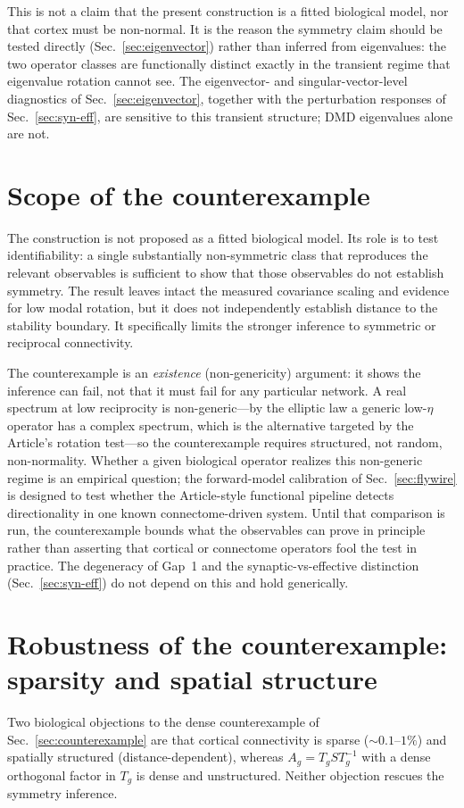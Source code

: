 \documentclass[11pt]{article}
\begin{document}
This is not a claim that the present construction is a fitted biological model,
nor that cortex must be non-normal. It is the reason the symmetry claim should
be tested directly (Sec.~\ref{sec:eigenvector}) rather than inferred from
eigenvalues: the two operator classes are functionally distinct exactly in the
transient regime that eigenvalue rotation cannot see. The eigenvector- and
singular-vector-level diagnostics of Sec.~\ref{sec:eigenvector}, together with
the perturbation responses of Sec.~\ref{sec:syn-eff}, are sensitive to this
transient structure; DMD eigenvalues alone are not.

\section{Scope of the counterexample}
The construction is not proposed as a fitted biological model. Its role is to
test identifiability: a single substantially non-symmetric class that reproduces
the relevant observables is sufficient to show that those observables do not
establish symmetry. The result leaves intact the measured covariance scaling and
evidence for low modal rotation, but it does not independently establish
distance to the stability boundary. It specifically limits the stronger
inference to symmetric or reciprocal connectivity.

The counterexample is an \emph{existence} (non-genericity) argument: it shows the
inference can fail, not that it must fail for any particular network. A real
spectrum at low reciprocity is non-generic---by the elliptic law a generic
low-$\eta$ operator has a complex spectrum, which is the alternative targeted
by the Article's rotation test---so the counterexample requires structured, not
random, non-normality. Whether a given biological operator realizes this
non-generic regime is an empirical question; the forward-model calibration of
Sec.~\ref{sec:flywire} is designed to test whether the Article-style functional
pipeline detects directionality in one known connectome-driven system. Until
that comparison is run, the counterexample bounds what the observables can prove
in principle rather than asserting that cortical or connectome operators fool
the test in practice. The
degeneracy of Gap~1 and the synaptic-vs-effective distinction
(Sec.~\ref{sec:syn-eff}) do not depend on this and hold generically.

\section{Robustness of the counterexample: sparsity and spatial structure}
\label{sec:sparse}
Two biological objections to the dense counterexample of
Sec.~\ref{sec:counterexample} are that cortical connectivity is sparse
($\sim0.1$--$1\%$) and spatially structured (distance-dependent), whereas
$A_g=T_gST_g^{-1}$ with a dense orthogonal factor in $T_g$ is dense and
unstructured. Neither objection rescues the symmetry inference.
\end{document}
